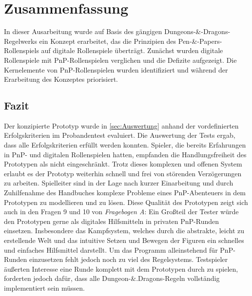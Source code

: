 \chapter{Zusammenfassung}
\label{conclusion}
In dieser Ausarbeitung wurde auf Basis des gängigen Dungeons-\&-Dragons-Regel\-werks ein Konzept erarbeitet, das die Prinzipien des Pen-\&-Papers-Rollenspiels auf digitale Rollenspiele überträgt. Zunächst wurden digitale Rollenspiele mit PnP-Rollenspielen verglichen und die Defizite aufgezeigt. Die Kernelemente von PnP-Rollenspielen wurden identifiziert und während der Erarbeitung des Konzeptes priorisiert.\\

\section{Fazit}
Der konzipierte Prototyp wurde in \ref{sec:Auswertung} anhand der vordefinierten Erfolgskriterien im Probandentest evaluiert. Die Auswertung der Tests ergab, dass alle Erfolgskriterien erfüllt werden konnten. Spieler, die bereits Erfahrungen in PnP- und digitalen Rollenspielen hatten, empfanden die Handlungsfreiheit des Prototypen als nicht eingeschränkt. Trotz dieses komplexen und offenen System erlaubt es der Prototyp weiterhin schnell und frei von störenden Verzögerungen zu arbeiten. Spielleiter sind in der Lage nach kurzer Einarbeitung und durch Zuhilfenahme des Handbuches komplexe Probleme eines PnP-Abenteuers in dem Prototypen zu modellieren und zu lösen. Diese Qualität des Prototypen zeigt sich auch in den Fragen 9 und 10 von \emph{Fragebogen A}: Ein Großteil der Tester würde den Prototypen gerne als digitales Hilfsmitteln in privaten PnP-Runden einsetzen. Insbesondere das Kampfsystem, welches durch die abstrakte, leicht zu erstellende Welt und das intuitive Setzen und Bewegen der Figuren ein schnelles und einfaches Hilfsmittel darstellt.\newline
Um das Programm alleinstehend für PnP-Runden einzusetzen fehlt jedoch noch zu viel des Regelsystems. Testspieler äußerten Interesse eine Runde komplett mit dem Prototypen durch zu spielen, forderten jedoch dafür, dass alle Dungeon-\&.Dragons-Regeln vollständig implementiert sein müssen.



